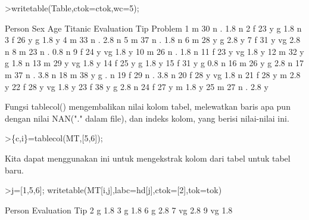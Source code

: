 \documentclass[a4paper,10pt]{article}
\begin{document}
\begin{eulernotebook}
\begin{eulerprompt}
>writetable(Table,ctok=ctok,wc=5);
\end{eulerprompt}
\begin{euleroutput}
   Person  Sex  Age Titanic Evaluation  Tip Problem
        1    m   30       n          .  1.8       n
        2    f   23       y          g  1.8       n
        3    f   26       y          g  1.8       y
        4    m   33       n          .  2.8       n
        5    m   37       n          .  1.8       n
        6    m   28       y          g  2.8       y
        7    f   31       y         vg  2.8       n
        8    m   23       n          .  0.8       n
        9    f   24       y         vg  1.8       y
       10    m   26       n          .  1.8       n
       11    f   23       y         vg  1.8       y
       12    m   32       y          g  1.8       n
       13    m   29       y         vg  1.8       y
       14    f   25       y          g  1.8       y
       15    f   31       y          g  0.8       n
       16    m   26       y          g  2.8       n
       17    m   37       n          .  3.8       n
       18    m   38       y          g    .       n
       19    f   29       n          .  3.8       n
       20    f   28       y         vg  1.8       n
       21    f   28       y          m  2.8       y
       22    f   28       y         vg  1.8       y
       23    f   38       y          g  2.8       n
       24    f   27       y          m  1.8       y
       25    m   27       n          .  2.8       y
\end{euleroutput}
\begin{eulercomment}
Fungsi tablecol() mengembalikan nilai kolom tabel, melewatkan baris
apa pun dengan nilai NAN("." dalam file), dan indeks kolom, yang
berisi nilai-nilai ini.
\end{eulercomment}
\begin{eulerprompt}
>\{c,i\}=tablecol(MT,[5,6]);
\end{eulerprompt}
\begin{eulercomment}
Kita dapat menggunakan ini untuk mengekstrak kolom dari tabel untuk
tabel baru.
\end{eulercomment}
\begin{eulerprompt}
>j=[1,5,6]; writetable(MT[i,j],labc=hd[j],ctok=[2],tok=tok)
\end{eulerprompt}
\begin{euleroutput}
      Person Evaluation       Tip
           2          g       1.8
           3          g       1.8
           6          g       2.8
           7         vg       2.8
           9         vg       1.8

\end{euleroutput}
\end{eulernotebook}
\end{document}
